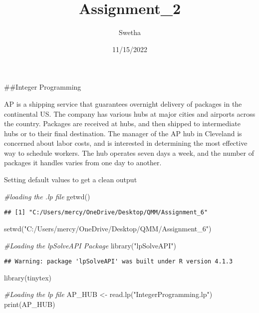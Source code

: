 \documentclass[
]{article}
\title{Assignment\_2}
\author{Swetha}
\date{11/15/2022}
\newenvironment{Shaded}{\begin{snugshade}}{\end{snugshade}}
\newcommand{\CommentTok}[1]{\textcolor[rgb]{0.56,0.35,0.01}{\textit{#1}}}
\newcommand{\FunctionTok}[1]{\textcolor[rgb]{0.00,0.00,0.00}{#1}}
\newcommand{\NormalTok}[1]{#1}
\newcommand{\OtherTok}[1]{\textcolor[rgb]{0.56,0.35,0.01}{#1}}
\newcommand{\StringTok}[1]{\textcolor[rgb]{0.31,0.60,0.02}{#1}}
\begin{document}
\maketitle

\#\#Integer Programming

AP is a shipping service that guarantees overnight delivery of packages
in the continental US. The company has various hubs at major cities and
airports across the country. Packages are received at hubs, and then
shipped to intermediate hubs or to their final destination. The manager
of the AP hub in Cleveland is concerned about labor costs, and is
interested in determining the most effective way to schedule workers.
The hub operates seven days a week, and the number of packages it
handles varies from one day to another.

Setting default values to get a clean output

\begin{Shaded}
\begin{Highlighting}[]
\CommentTok{\#loading the .lp file}
\FunctionTok{getwd}\NormalTok{()}
\end{Highlighting}
\end{Shaded}

\begin{verbatim}
## [1] "C:/Users/mercy/OneDrive/Desktop/QMM/Assignment_6"
\end{verbatim}

\begin{Shaded}
\begin{Highlighting}[]
\FunctionTok{setwd}\NormalTok{(}\StringTok{"C:/Users/mercy/OneDrive/Desktop/QMM/Assignment\_6"}\NormalTok{)}
\end{Highlighting}
\end{Shaded}

\begin{Shaded}
\begin{Highlighting}[]
\CommentTok{\#Loading the lpSolveAPI Package}
\FunctionTok{library}\NormalTok{(}\StringTok{"lpSolveAPI"}\NormalTok{)}
\end{Highlighting}
\end{Shaded}

\begin{verbatim}
## Warning: package 'lpSolveAPI' was built under R version 4.1.3
\end{verbatim}

\begin{Shaded}
\begin{Highlighting}[]
\FunctionTok{library}\NormalTok{(tinytex)}

\CommentTok{\#Loading the lp file}
\NormalTok{AP\_HUB }\OtherTok{\textless{}{-}} \FunctionTok{read.lp}\NormalTok{(}\StringTok{"IntegerProgramming.lp"}\NormalTok{)}
\FunctionTok{print}\NormalTok{(AP\_HUB)}
\end{Highlighting}
\end{Shaded}
\end{document}
